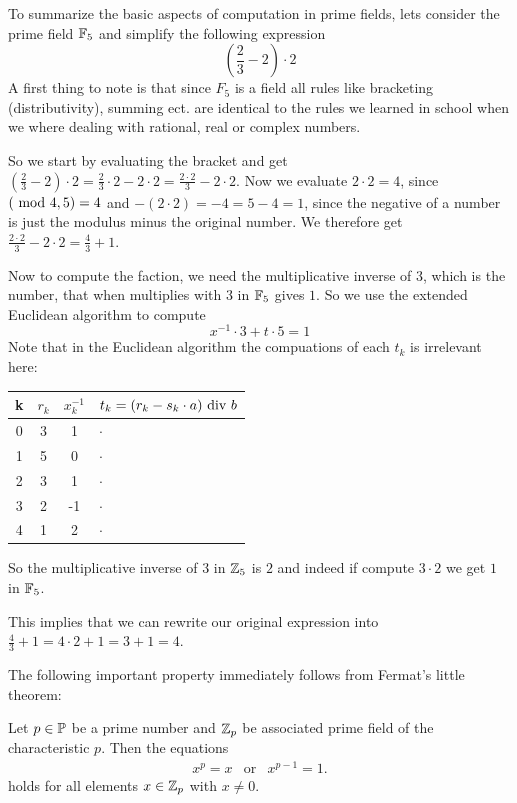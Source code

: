 \begin{example}
To summarize the basic aspects of computation in prime fields, lets consider the prime field $\mathbb{F}_5$ and simplify the following expression 
$$\left(\frac{2}{3} - 2\right)\cdot 2 $$
A first thing to note is that since $F_5$ is a field all rules like bracketing (distributivity), summing ect. are identical to the rules we learned in school when we where dealing with rational, real or complex numbers.

So we start by evaluating the bracket and get $\left(\frac{2}{3} - 2\right)\cdot 2 = \frac{2}{3}\cdot 2 - 2\cdot 2= \frac{2\cdot 2}{3} - 2\cdot 2$. Now we evaluate $2\cdot 2 = 4$, since $( \text{ mod } 4,5)=4$ and $-(2\cdot 2) = -4=5-4=1$, since the negative of a number is just the modulus minus the original number. We therefore get $\frac{2\cdot 2}{3} - 2\cdot 2 = \frac{4}{3}+1$. 

Now to compute the faction, we need the multiplicative inverse of $3$, which is the number, that when multiplies with $3$ in $\mathbb{F}_5$ gives $1$. So we use the extended Euclidean algorithm to compute
$$x^{-1}\cdot 3 + t \cdot 5 =1$$
Note that in the Euclidean algorithm the compuations of each $t_k$ is irrelevant here:
\begin{center}
  \begin{tabular}{c | c c l}
    k & $ r_k $ & $ x^{-1}_k $ & $ t_k = (r_k-s_k \cdot a) \text{ div } b $ \\\hline
    0 & 3 & 1 & $\cdot$\ \\
    1 & 5 & 0 & $\cdot$ \\
    2 & 3 & 1 & $\cdot$ \\
    3 & 2 &-1 & $\cdot$ \\
    4 & 1 & 2  & $\cdot$ \\
  \end{tabular}
\end{center}
So the multiplicative inverse of $3$ in $\mathbb{Z}_5$ is $2$ and indeed if compute $3\cdot 2$ we get $1$ in $\mathbb{F}_5$. 

This implies that we can rewrite our original expression into $\frac{4}{3}+1 = 4\cdot 2 + 1 = 3+1 =4$.
\end{example}

The following important property immediately follows from Fermat's little theorem:
\begin{lemma}
\label{lemma: klein_satz_fermat}
Let $ p \in \mathbb{P} $ be a prime number and $ \mathbb{Z}_p $ be associated prime field of the characteristic $ p $. Then the equations
\begin{equation}
\begin{array}{ccc}
x^p = x & \text{or} & x^{p-1} = 1.
\end{array}
\end{equation}
holds for all elements $ x \in \mathbb{Z}_p $ with $x\neq 0$.
\end{lemma}

